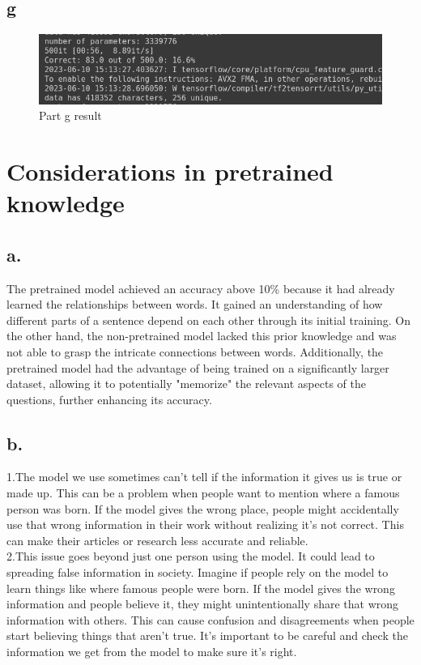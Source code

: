 \documentclass[a4paper]{article}
\begin{document}
\subsection*{g}

\begin{figure}[ht]
    \centering
    \includegraphics[width=1\textwidth]{./image/2.g.png}
    \caption{Part g result}
\end{figure}

\newpage

\section{Considerations in pretrained knowledge}

\subsection*{a.}
The pretrained model achieved an accuracy above 10\% because it had already learned the relationships between words. It gained an understanding of how different parts of a sentence depend on each other through its initial training. On the other hand, the non-pretrained model lacked this prior knowledge and was not able to grasp the intricate connections between words. Additionally, the pretrained model had the advantage of being trained on a significantly larger dataset, allowing it to potentially "memorize" the relevant aspects of the questions, further enhancing its accuracy.

\subsection*{b.}
1.The model we use sometimes can't tell if the information it gives us is true or made up. This can be a problem when people want to mention where a famous person was born. If the model gives the wrong place, people might accidentally use that wrong information in their work without realizing it's not correct. This can make their articles or research less accurate and reliable.\\

2.This issue goes beyond just one person using the model. It could lead to spreading false information in society. Imagine if people rely on the model to learn things like where famous people were born. If the model gives the wrong information and people believe it, they might unintentionally share that wrong information with others. This can cause confusion and disagreements when people start believing things that aren't true. It's important to be careful and check the information we get from the model to make sure it's right.
\end{document}

